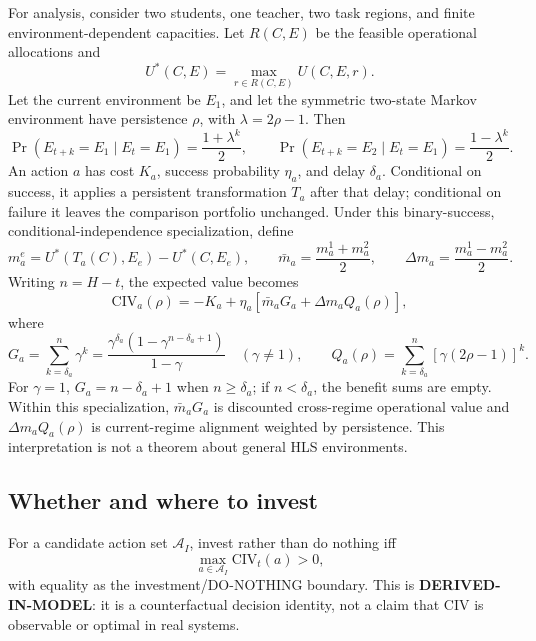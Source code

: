For analysis, consider two students, one teacher, two task regions, and finite environment-dependent capacities. Let $R(C,E)$ be the feasible operational allocations and
\begin{equation}
U^*(C,E)=\max_{r\in R(C,E)}U(C,E,r).
\label{eq:civ-operational-value}
\end{equation}
Let the current environment be $E_1$, and let the symmetric two-state Markov environment have persistence $\rho$, with $\lambda=2\rho-1$. Then
\begin{equation}
\Pr(E_{t+k}=E_1\mid E_t=E_1)=\frac{1+\lambda^k}{2},\qquad
\Pr(E_{t+k}=E_2\mid E_t=E_1)=\frac{1-\lambda^k}{2}.
\label{eq:civ-markov}
\end{equation}
An action $a$ has cost $K_a$, success probability $\eta_a$, and delay $\delta_a$. Conditional on success, it applies a persistent transformation $T_a$ after that delay; conditional on failure it leaves the comparison portfolio unchanged. Under this binary-success, conditional-independence specialization, define
\begin{equation}
m_a^e=U^*(T_a(C),E_e)-U^*(C,E_e),\qquad
\bar m_a=\frac{m_a^1+m_a^2}{2},\qquad
\Delta m_a=\frac{m_a^1-m_a^2}{2}.
\label{eq:civ-marginal-values}
\end{equation}
Writing $n=H-t$, the expected value becomes
\begin{equation}
\mathrm{CIV}_a(\rho)=-K_a+\eta_a\left[\bar m_aG_a+\Delta m_aQ_a(\rho)\right],
\label{eq:civ-two-regime}
\end{equation}
where
\begin{equation}
G_a=\sum_{k=\delta_a}^{n}\gamma^k
=\frac{\gamma^{\delta_a}\left(1-\gamma^{n-\delta_a+1}\right)}{1-\gamma}\quad(\gamma\ne1),
\qquad
Q_a(\rho)=\sum_{k=\delta_a}^{n}\left[\gamma(2\rho-1)\right]^k.
\label{eq:civ-exposure-terms}
\end{equation}
For $\gamma=1$, $G_a=n-\delta_a+1$ when $n\geq\delta_a$; if $n<\delta_a$, the benefit sums are empty. Within this specialization, $\bar m_aG_a$ is discounted cross-regime operational value and $\Delta m_aQ_a(\rho)$ is current-regime alignment weighted by persistence. This interpretation is not a theorem about general HLS environments.

\subsection{Whether and where to invest}

For a candidate action set $\mathcal A_I$, invest rather than do nothing iff
\begin{equation}
\max_{a\in\mathcal A_I}\mathrm{CIV}_t(a)>0,
\label{eq:civ-invest}
\end{equation}
with equality as the investment/DO-NOTHING boundary. This is \textbf{DERIVED-IN-MODEL}: it is a counterfactual decision identity, not a claim that CIV is observable or optimal in real systems.

